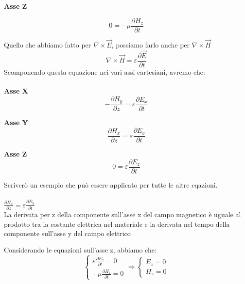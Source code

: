 \textbf{Asse Z}  

{
    \Large 
    \begin{equation}
        0 = -\mu \frac{\partial H_z}{\partial t}   
    \end{equation}
}

Quello che abbiamo fatto per $\nabla \times \vec{E}$, possiamo farlo anche per $\nabla \times \vec{H}$ \\ 

{
    \Large
    \begin{equation}
     \nabla \times \vec{H} = \varepsilon \frac{\partial \vec{E}}{\partial t}   
    \end{equation}
}
Scomponendo questa equazione nei vari assi cartesiani, avremo che: \\ \\ 

\textbf{Asse X} 
{
    \Large 
    \begin{equation}
    -\frac{\partial H_y}{\partial z} = \varepsilon \frac{\partial E_x}{\partial t}   
    \end{equation}
}

\textbf{Asse Y} 
{
    \Large 
    \begin{equation}
     \frac{\partial H_x}{\partial z} = \varepsilon \frac{\partial E_y}{\partial t}   
    \end{equation}
}


\textbf{Asse Z} 
{
    \Large
    \begin{equation}
        0 = \varepsilon \frac{\partial E_z}{\partial t}    
    \end{equation}
}

\begin{tcolorbox}
    Scriverò un esempio che può essere applicato per tutte le altre eqazioni. \\ \\ 
    $\frac{\partial H_x}{\partial z} = \varepsilon \frac{\partial E_y}{\partial t}$ \\ 

    La derivata per z della componente sull'asse x del campo magnetico è uguale al prodotto tra la costante elettrica nel materiale e la derivata 
    nel tempo della componente sull'asse y del campo elettrico 

\end{tcolorbox}

Considerando le equazioni sull'asse z, abbiamo che: \\ 

{ \Large \begin{equation}
    \begin{cases}
        \varepsilon \frac{\partial E_z}{\partial t} = 0 \\
        -\mu \frac{\partial H_z}{\partial t} = 0 
    \end{cases} 
    \Rightarrow
    \begin{cases}
        E_z = 0\\
        H_z = 0 
    \end{cases}
\end{equation}} \\ 

